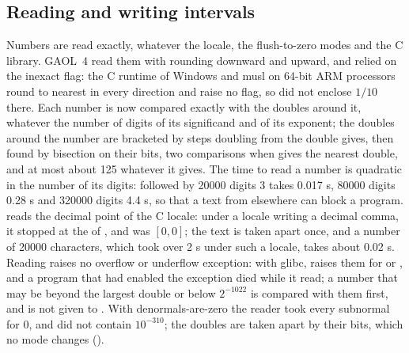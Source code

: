 \documentclass[12pt,a4paper,twoside,openright]{book}
\begin{document}
\subsection{Reading and writing intervals}
\label{sec:changes-io}
%
%

Numbers are read exactly, whatever the locale, the flush-to-zero modes and
the C library.\newinvfive{} GAOL~4 read them with  rounding
downward and upward, and relied on the inexact flag: the C runtime of Windows
and musl on 64-bit ARM processors round to nearest in every direction and
raise no flag, so  did not enclose $1/10$ there. Each
number is now compared exactly with the doubles around it, whatever the
number of digits of its significand and of its exponent; the doubles around
the number are bracketed by steps doubling from the double 
gives, then found by bisection on their bits, two comparisons when
 gives the nearest double, and at most about 125 whatever it
gives. The time to read a number is quadratic in the number of its digits:
 followed by 20000 digits 3 takes 0.017 s, 80000 digits 0.28 s
and 320000 digits 4.4 s, so that a text from elsewhere can block a program.
 reads the decimal point of the C locale: under a locale
writing a decimal comma, it stopped at the  of , and
 was $[0, 0]$; the text is taken apart once, and a
number of 20000 characters, which took over 2 s under such a locale, takes
about 0.02 s. Reading raises no overflow or underflow exception: with glibc,
 raises them for  or , and a program
that had enabled the exception died while it read; a number that may be
beyond the largest double or below $2^{-1022}$ is compared with them first,
and is not given to . With denormals-are-zero the reader took
every subnormal for 0, and  did not contain
$10^{-310}$; the doubles are taken apart by their bits, which no mode
changes ().
\end{document}
